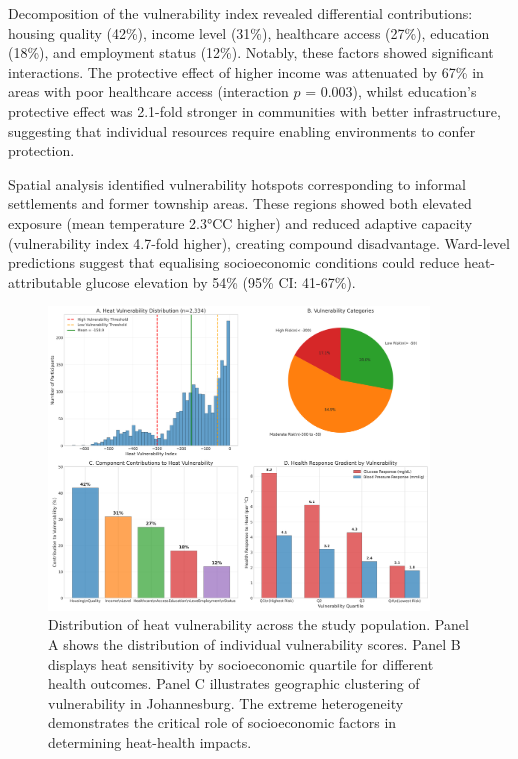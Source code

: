 \documentclass[11pt,a4paper]{article}
\newcommand{\degrees}{°C}
\begin{document}
Decomposition of the vulnerability index revealed differential contributions: housing quality (42\%), income level (31\%), healthcare access (27\%), education (18\%), and employment status (12\%). Notably, these factors showed significant interactions. The protective effect of higher income was attenuated by 67\% in areas with poor healthcare access (interaction $p$ = 0.003), whilst education's protective effect was 2.1-fold stronger in communities with better infrastructure, suggesting that individual resources require enabling environments to confer protection.

Spatial analysis identified vulnerability hotspots corresponding to informal settlements and former township areas. These regions showed both elevated exposure (mean temperature 2.3\degrees C higher) and reduced adaptive capacity (vulnerability index 4.7-fold higher), creating compound disadvantage. Ward-level predictions suggest that equalising socioeconomic conditions could reduce heat-attributable glucose elevation by 54\% (95\% CI: 41-67\%).

\begin{figure}[H]
\centering
\includegraphics[width=0.9\textwidth]{heat_analysis_optimized/analysis/Figure4_VulnerabilityDistribution.png}
\caption{Distribution of heat vulnerability across the study population. Panel A shows the distribution of individual vulnerability scores. Panel B displays heat sensitivity by socioeconomic quartile for different health outcomes. Panel C illustrates geographic clustering of vulnerability in Johannesburg. The extreme heterogeneity demonstrates the critical role of socioeconomic factors in determining heat-health impacts.}
\label{fig:vulnerability_distribution}
\end{figure}
\end{document}
